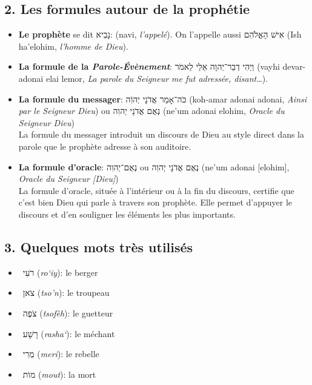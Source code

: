\subsection*{2. Les formules autour de la prophétie}
\begin{itemize}[label=]
    \item \textbf{Le prophète} se dit \texthebrew{נָבִיא}: (navi, \textit{l'appelé}). On l'appelle aussi \texthebrew{אִישׁ הָאֱלֹהִם} (Ish ha’elohim, \textit{l'homme de Dieu}).
    \item \textbf{La formule de la \textit{Parole-Évènement}}: \texthebrew{וַיְהִי דְבַר־יְהוָה אֵלַי לֵאמֹר} (vayhi devar-adonai elai lemor, \textit{La parole du Seigneur me fut adressée, disant…}).
    \item \textbf{La formule du messager}: \texthebrew{כֹּה־אָמַר אֲדֹנָי יְהוִֹה} (koh-amar adonai adonai, \textit{Ainsi par le Seigneur Dieu}) ou \texthebrew{נְאֻם אֲדֹנָי יְהוִה} (ne’um adonai elohim, \textit{Oracle du Seigneur Dieu}) \\
          La formule du messager introduit un discours de Dieu au style direct dans la parole que le prophète adresse à son auditoire.
    \item \textbf{La formule d'oracle}: \texthebrew{נְאֻם־יְהוִה} ou \texthebrew{נְאֻם אֲדֹנָי יְהוִה} (ne’um adonai [elohim], \textit{Oracle du Seigneur [Dieu]})\\
          La formule d'oracle, située à l'intérieur ou à la fin du discours, certifie que c'est bien Dieu qui parle à travers son prophète. Elle permet d'appuyer le discours et d'en souligner les éléments les plus importants.
\end{itemize}

\subsection*{3. Quelques mots très utilisés}
\begin{itemize}[label=]
    \item ~\texthebrew{רֹעִי} (\textit{ro‘iy}): le berger
    \item ~\texthebrew{צֹאן} (\textit{tso'n}): le troupeau
    \item ~\texthebrew{צֹפֶה} (\textit{tsofèh}): le guetteur
    \item ~\texthebrew{רָשָׁע} (\textit{rasha‘}): le méchant
    \item ~\texthebrew{מְרִי} (\textit{meri}): le rebelle
    \item ~\texthebrew{מוֹת} (\textit{mout}): la mort
\end{itemize}